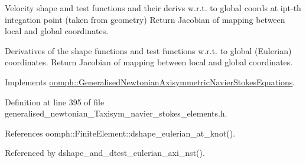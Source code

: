 Velocity shape and test functions and their derivs w.\+r.\+t. to global coords at ipt-\/th integation point (taken from geometry) Return Jacobian of mapping between local and global coordinates. 

Derivatives of the shape functions and test functions w.\+r.\+t. to global (Eulerian) coordinates. Return Jacobian of mapping between local and global coordinates. 

Implements \hyperlink{classoomph_1_1GeneralisedNewtonianAxisymmetricNavierStokesEquations_aea547f513386ed96746cbf55f70d6f78}{oomph\+::\+Generalised\+Newtonian\+Axisymmetric\+Navier\+Stokes\+Equations}.



Definition at line 395 of file generalised\+\_\+newtonian\+\_\+\+Taxisym\+\_\+navier\+\_\+stokes\+\_\+elements.\+h.



References oomph\+::\+Finite\+Element\+::dshape\+\_\+eulerian\+\_\+at\+\_\+knot().



Referenced by dshape\+\_\+and\+\_\+dtest\+\_\+eulerian\+\_\+axi\+\_\+nst().

\mbox{\label{classoomph_1_1GeneralisedNewtonianAxisymmetricTCrouzeixRaviartElement_aa0b53fa6fea4f83b0e4828f83804d11e}} 
